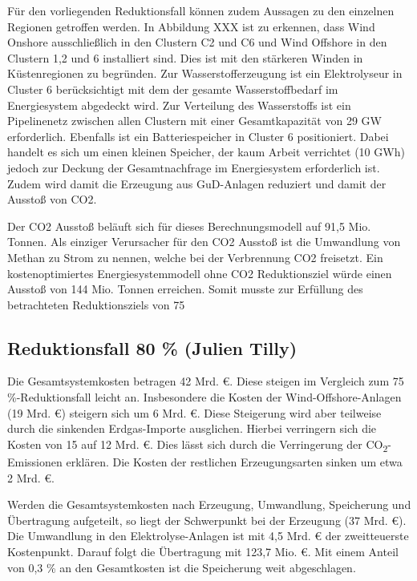 Für den vorliegenden Reduktionsfall können zudem Aussagen zu den einzelnen Regionen getroffen werden. In Abbildung XXX ist zu erkennen, dass Wind Onshore ausschließlich in den Clustern C2 und C6 und Wind Offshore in den Clustern 1,2 und 6 installiert sind. Dies ist mit den stärkeren Winden in Küstenregionen zu begründen. Zur Wasserstofferzeugung ist ein Elektrolyseur in Cluster 6 berücksichtigt mit dem der gesamte Wasserstoffbedarf im Energiesystem abgedeckt wird. Zur Verteilung des Wasserstoffs ist ein Pipelinenetz zwischen allen Clustern mit einer Gesamtkapazität von 29 GW erforderlich. Ebenfalls ist ein Batteriespeicher in Cluster 6 positioniert. Dabei handelt es sich um einen kleinen Speicher, der kaum Arbeit verrichtet (10 GWh) jedoch zur Deckung der Gesamtnachfrage im Energiesystem erforderlich ist. Zudem wird damit die Erzeugung aus GuD-Anlagen reduziert und damit der Ausstoß von CO2. 

Der CO2 Ausstoß beläuft sich für dieses Berechnungsmodell auf 91,5 Mio. Tonnen. Als einziger Verursacher für den CO2 Ausstoß ist die Umwandlung von Methan zu Strom zu nennen, welche bei der Verbrennung CO2 freisetzt. Ein kostenoptimiertes Energiesystemmodell ohne CO2 Reduktionsziel würde einen Ausstoß von 144 Mio. Tonnen erreichen. Somit musste zur Erfüllung des betrachteten Reduktionsziels von 75 %


\newpage
\subsection{Reduktionsfall 80 \% (Julien Tilly)}
Die Gesamtsystemkosten betragen 42 Mrd. €. Diese steigen im Vergleich zum 75 \%-Reduktionsfall leicht an. Insbesondere die Kosten der Wind-Offshore-Anlagen (19 Mrd. €) steigern sich um 6 Mrd. €. Diese Steigerung wird aber teilweise durch die sinkenden Erdgas-Importe ausglichen. Hierbei verringern sich die Kosten von 15 auf 12 Mrd. €. Dies lässt sich durch die Verringerung der CO\textsubscript{2}-Emissionen erklären. Die Kosten der restlichen Erzeugungsarten sinken um etwa 2 Mrd. €.

Werden die Gesamtsystemkosten nach Erzeugung, Umwandlung, Speicherung und Über\-tragung aufgeteilt, so liegt der Schwerpunkt bei der Erzeugung (37 Mrd. €). Die Umwandlung in den Elektrolyse-Anlagen ist mit 4,5 Mrd. € der zweitteuerste Kostenpunkt. Darauf folgt die Übertragung mit 123,7 Mio. €. Mit einem Anteil von 0,3 \% an den Gesamtkosten ist die Speicherung weit abgeschlagen.

